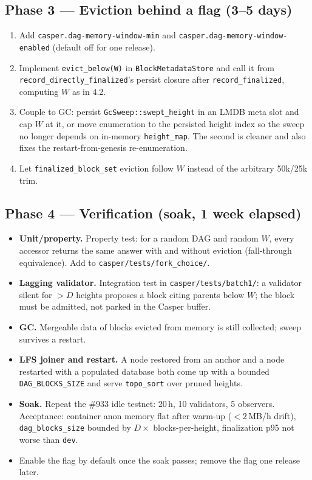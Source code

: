 \documentclass[11pt]{article}
\newcommand{\code}[1]{\texttt{#1}}
\begin{document}
\subsection*{Phase 3 --- Eviction behind a flag (3--5 days)}
\begin{enumerate}
\item Add \code{casper.dag-memory-window-min} and
  \code{casper.dag-memory-window-enabled} (default off for one release).
\item Implement \code{evict\_below(W)} in \code{BlockMetadataStore} and call
  it from \code{record\_directly\_finalized}'s persist closure after
  \code{record\_finalized}, computing $W$ as in 4.2.
\item Couple to GC: persist \code{GcSweep::swept\_height} in an LMDB meta
  slot and cap $W$ at it, or move enumeration to the persisted height index
  so the sweep no longer depends on in-memory \code{height\_map}. The second
  is cleaner and also fixes the restart-from-genesis re-enumeration.
\item Let \code{finalized\_block\_set} eviction follow $W$ instead of the
  arbitrary 50k/25k trim.
\end{enumerate}

\subsection*{Phase 4 --- Verification (soak, 1 week elapsed)}
\begin{itemize}
\item \textbf{Unit/property.} Property test: for a random DAG and random
  $W$, every accessor returns the same answer with and without eviction
  (fall-through equivalence). Add to \code{casper/tests/fork\_choice/}.
\item \textbf{Lagging validator.} Integration test in
  \code{casper/tests/batch1/}: a validator silent for $> D$ heights proposes
  a block citing parents below $W$; the block must be admitted, not parked
  in the Casper buffer.
\item \textbf{GC.} Mergeable data of blocks evicted from memory is still
  collected; sweep survives a restart.
\item \textbf{LFS joiner and restart.} A node restored from an anchor and a
  node restarted with a populated database both come up with a bounded
  \code{DAG\_BLOCKS\_SIZE} and serve \code{topo\_sort} over pruned heights.
\item \textbf{Soak.} Repeat the \#933 idle testnet: 20\,h, 10 validators,
  5 observers. Acceptance: container anon memory flat after warm-up
  ($< 2$\,MB/h drift), \code{dag\_blocks\_size} bounded by
  $D \times$ blocks-per-height, finalization p95 not worse than \code{dev}.
\item Enable the flag by default once the soak passes; remove the flag one
  release later.
\end{itemize}
\end{document}
